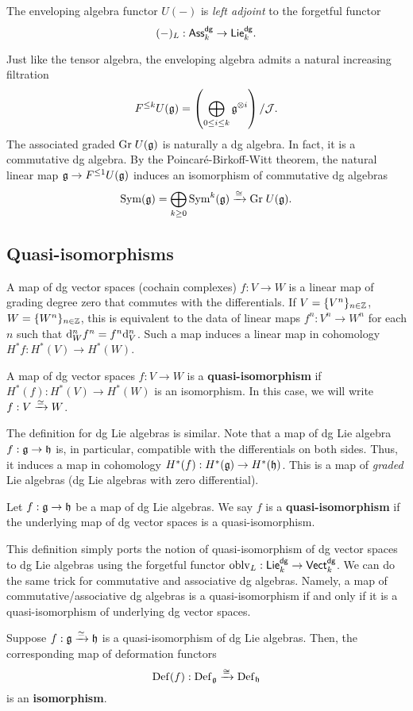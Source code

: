 \documentclass[11pt]{amsart}
\def\dgVect{{\sf Vect}^{\sf dg}}
\def\dgLie{{\sf Lie}^{\sf dg}}
\def\dgAss{{\sf Ass}^{\sf dg}}
\begin{document}
\begin{fact}
The enveloping algebra functor $U(-)$ is {\em left adjoint} to the forgetful functor 
\[
(-)_L : \dgAss_k \to \dgLie_k .
\]
\end{fact}

\begin{rmk}
Just like the tensor algebra, the enveloping algebra admits a natural increasing filtration
\[
F^{\leq k} U(\mathfrak g) = \left(\bigoplus_{0 \leq i \leq k} \mathfrak g^{\otimes i}\right) / \mathcal J .
\]
The associated graded ${\rm Gr} \; U(\mathfrak g)$ is naturally a dg algebra. 
In fact, it is a commutative dg algebra. 
By the Poincar\'{e}-Birkoff-Witt theorem, the natural linear map $\mathfrak g \to F^{\leq 1}U(\mathfrak g)$ induces an isomorphism of commutative dg algebras
\[
{\rm Sym}(\mathfrak g) = \bigoplus_{k \geq 0} {\rm Sym}^k(\mathfrak g) \xrightarrow{\cong} {\rm Gr} \; U(\mathfrak g) . 
\] 
\end{rmk}

\subsection{Quasi-isomorphisms}\label{sec: quasi}

A map of dg vector spaces (cochain complexes) $f : V \to W$ is a linear map of grading degree zero that commutes with the differentials. 
If $V = \{V^n\}_{n \in \mathbb Z}$, $W = \{W^n\}_{n \in \mathbb Z}$,
this is equivalent to the data of linear maps $f^n : V^n \to W^n$ for each $n$ such that ${\rm d}^n_W f^n = f^n {\rm d}^n_V$. 
Such a map induces a linear map in cohomology $H^*f : H^*(V) \to H^*(W)$. 

\begin{dfn}
A map of dg vector spaces $f : V \to W$ is a {\bf quasi-isomorphism} if $H^*(f) : H^*(V) \to H^*(W)$ is an isomorphism. 
In this case, we will write $f : V \xrightarrow{\simeq} W$. 
\end{dfn}

The definition for dg Lie algebras is similar. 
Note that a map of dg Lie algebra $f : \mathfrak g \to \mathfrak h$ is, in particular, compatible with the differentials on both sides. 
Thus, it induces a map in cohomology $H^*(f) : H^*(\mathfrak g) \to H^*(\mathfrak h)$.
This is a map of {\em graded} Lie algebras (dg Lie algebras with zero differential). 

\begin{dfn}
Let $f : \mathfrak g \to \mathfrak h$ be a map of dg Lie algebras. 
We say $f$ is a {\bf quasi-isomorphism} if the underlying map of dg vector spaces is a quasi-isomorphism.
\end{dfn}

This definition simply ports the notion of quasi-isomorphism of dg vector spaces to dg Lie algebras using the forgetful functor $\oblv_L : \dgLie_k \to \dgVect_k$. 
We can do the same trick for commutative and associative dg algebras.
Namely, a map of commutative/associative dg algebras is a quasi-isomorphism if and only if it is a quasi-isomorphism of underlying dg vector spaces. 


\begin{thm}
Suppose $f : \mathfrak g \xrightarrow{\simeq} \mathfrak h$ is a quasi-isomorphism of dg Lie algebras. 
Then, the corresponding map of deformation functors
\[
{\rm Def}(f) : {\rm Def}_\mathfrak g \xrightarrow{\cong} {\rm Def}_\mathfrak h
\]
is an {\bf isomorphism}. 
\end{thm}
\end{document}
